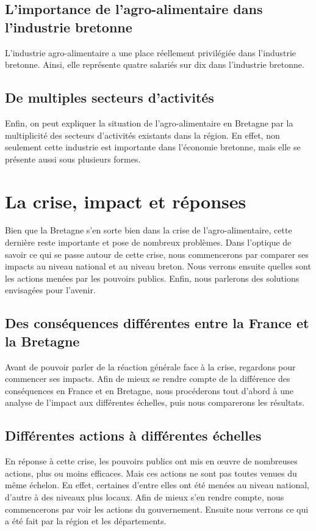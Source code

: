 \documentclass[a4paper,10pt]{report}
\begin{document}
		\subsection{L'importance de l'agro-alimentaire dans l'industrie bretonne}
			L’industrie agro-alimentaire a une place réellement privilégiée dans l’industrie bretonne. Ainsi, elle représente quatre salariés sur dix dans l’industrie bretonne.
			
		\subsection{De multiples secteurs d'activités}
			Enfin, on peut expliquer la situation de l’agro-alimentaire en Bretagne par la multiplicité des secteurs d’activités existants dans la région. En effet, non seulement cette industrie est importante dans l’économie bretonne, mais elle se présente aussi sous plusieurs formes.
			
	\section{La crise, impact et réponses}
		Bien que la Bretagne s’en sorte bien dans la crise de l’agro-alimentaire, cette dernière reste importante et pose de nombreux problèmes. Dans l’optique de savoir ce qui se passe autour de cette crise, nous commencerons par comparer ses impacts au niveau national et au niveau breton. Nous verrons ensuite quelles sont les actions menées par les pouvoirs publics. Enfin, nous parlerons des solutions envisagées pour l’avenir.
		
		\subsection{Des conséquences différentes entre la France et la Bretagne}
			Avant de pouvoir parler de la réaction générale face à la crise, regardons pour commencer ses impacts. Afin de mieux se rendre compte de la différence des conséquences en France et en Bretagne, nous procéderons tout d’abord à une analyse de l’impact aux différentes échelles, puis nous comparerons les résultats.
			
		\subsection{Différentes actions à différentes échelles}
			En réponse à cette crise, les pouvoirs publics ont mis en œuvre de nombreuses actions, plus ou moins efficaces. Mais ces actions ne sont pas toutes venues du même échelon. En effet, certaines d’entre elles ont été menées au niveau national, d’autre à des niveaux plus locaux. Afin de mieux s’en rendre compte, nous commencerons par voir les actions du gouvernement. Ensuite nous verrons ce qui a été fait par la région et les départements.
			
\end{document}

